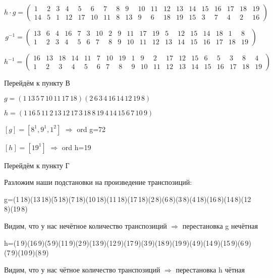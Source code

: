 \documentclass[utf8,14pt,a4paper,oneside,russian]{book}
\begin{document}
	\[ h \cdot g = \left( 
	\begin{array}{ccccccccccccccccccc}
	1&2&3&4&5&6&7&8&9&10&11&12&13&14&15&16&17&18&19\\
	14&5&1&12&17&10&11&8&13&9&6&18&19&15&3&7&4&2&16
	\end{array} 
	\right) \]
	
	\[ g^{-1} = \left( 
	\begin{array}{ccccccccccccccccccc}
	13&6&4&16&7&3&10&2&9&11&17&19&5&12&15&14&18&1&8\\
	1&2&3&4&5&6&7&8&9&10&11&12&13&14&15&16&17&18&19
	\end{array} 
	\right) \]
	
	\[ h^{-1} = \left( 
	\begin{array}{ccccccccccccccccccc}
	16&13&18&14&11&7&10&19&1&9&2&17&12&15&6&5&3&8&4\\
	1&2&3&4&5&6&7&8&9&10&11&12&13&14&15&16&17&18&19
	\end{array} 
	\right) \]
	
	\vspace{\baselineskip}
	
	Перейдём к пункту В
	
	$g=(1\,13\,5\,7\,10\,11\,17\,18)(2\,6\,3\,4\,16\,14\,12\,19\,8)$
	
	$h=(1\,16\,5\,11\,2\,13\,12\,17\,3\,18\,8\,19\,4\,14\,15\,6\,7\,10\,9)$
	
	$[g]=[8^{1},9^{1},1^{2}]$ $\Rightarrow$ ord g=72
	
	$[h]=[19^{1}]$ $\Rightarrow$ ord h=19
	
	\vspace{\baselineskip}
	
	Перейдём к пункту Г
	
	Разложим наши подстановки на произведение транспозиций:
	
	g=(1\,18)(13\,18)(5\,18)(7\,18)(10\,18)(11\,18)(17\,18)(2\,8)(6\,8)(3\,8)(4\,18)(16\,8)(14\,8)(12\,8)(19\,8)
	
	Видим, что у нас нечётное количество транспозиций $\Rightarrow$ перестановка g нечётная
	
	h=(1\,9)(16\,9)(5\,9)(11\,9)(2\,9)(13\,9)(12\,9)(17\,9)(3\,9)(18\,9)(19\,9)(4\,9)(14\,9)(15\,9)(6\,9)(7\,9)(10\,9)(8\,9) 
	
	Видим, что у нас чётное количество транспозиций $\Rightarrow$ перестановка h чётная
	
\end{document}
